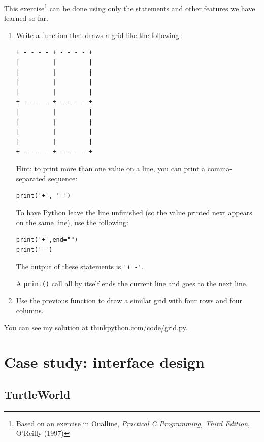 \documentclass[10pt]{book}
\begin{document}
\begin{ex}
This exercise\footnote{Based on an exercise in Oualline, {\em
    Practical C Programming, Third Edition}, O'Reilly (1997)} can be
done using only the statements and other features we have learned so
far.  


\begin{enumerate}

\item Write a function that draws a grid like the
  following:

\beforeverb
\begin{verbatim}
+ - - - - + - - - - +
|         |         |
|         |         |
|         |         |
|         |         |
+ - - - - + - - - - +
|         |         |
|         |         |
|         |         |
|         |         |
+ - - - - + - - - - +
\end{verbatim}
\afterverb
%
Hint: to print more than one value on a line, you can print
a comma-separated sequence:

\beforeverb
\begin{verbatim}
print('+', '-')
\end{verbatim}
\afterverb
%

To have Python leave the line unfinished (so the value printed next appears on the same line), use the following:
\beforeverb
\begin{verbatim}
print('+',end="")
print('-')
\end{verbatim}
\afterverb
%
The output of these statements is \verb"'+ -'".

A {\tt print()} call all by itself ends the current line and
goes to the next line.

\item Use the previous function to draw a similar grid
with four rows and four columns.

\end{enumerate}

You can see my solution at \url{thinkpython.com/code/grid.py}.

\end{ex}





\chapter{Case study: interface design}
\label{turtlechap}

\section{TurtleWorld}
\end{document}
